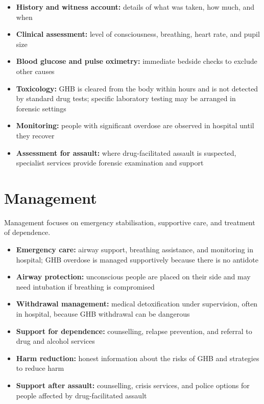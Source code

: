 \begin{itemize}
    \item \textbf{History and witness account:} details of what was taken, how much, and when
    \item \textbf{Clinical assessment:} level of consciousness, breathing, heart rate, and pupil size
    \item \textbf{Blood glucose and pulse oximetry:} immediate bedside checks to exclude other causes
    \item \textbf{Toxicology:} GHB is cleared from the body within hours and is not detected by standard drug tests; specific laboratory testing may be arranged in forensic settings
    \item \textbf{Monitoring:} people with significant overdose are observed in hospital until they recover
    \item \textbf{Assessment for assault:} where drug-facilitated assault is suspected, specialist services provide forensic examination and support
\end{itemize}

\section*{Management}
Management focuses on emergency stabilisation, supportive care, and treatment of dependence.

\begin{itemize}
    \item \textbf{Emergency care:} airway support, breathing assistance, and monitoring in hospital; GHB overdose is managed supportively because there is no antidote
    \item \textbf{Airway protection:} unconscious people are placed on their side and may need intubation if breathing is compromised
    \item \textbf{Withdrawal management:} medical detoxification under supervision, often in hospital, because GHB withdrawal can be dangerous
    \item \textbf{Support for dependence:} counselling, relapse prevention, and referral to drug and alcohol services
    \item \textbf{Harm reduction:} honest information about the risks of GHB and strategies to reduce harm
    \item \textbf{Support after assault:} counselling, crisis services, and police options for people affected by drug-facilitated assault
\end{itemize}

